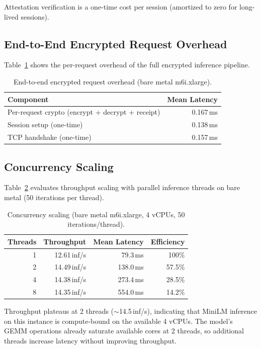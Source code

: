 \documentclass[11pt,a4paper]{article}
\begin{document}
Attestation verification is a one-time cost per session (amortized to zero for long-lived sessions).

\subsection{End-to-End Encrypted Request Overhead}

Table~\ref{tab:e2e} shows the per-request overhead of the full encrypted inference pipeline.

\begin{table}[ht]
\centering
\caption{End-to-end encrypted request overhead (bare metal m6i.xlarge).}
\label{tab:e2e}
\begin{tabular}{lr}
\hline
\textbf{Component} & \textbf{Mean Latency} \\
\hline
Per-request crypto (encrypt + decrypt + receipt) & 0.167\,ms \\
Session setup (one-time)                         & 0.138\,ms \\
TCP handshake (one-time)                         & 0.157\,ms \\
\hline
\end{tabular}
\end{table}

\subsection{Concurrency Scaling}

Table~\ref{tab:concurrency} evaluates throughput scaling with parallel inference threads on bare metal (50 iterations per thread).

\begin{table}[ht]
\centering
\caption{Concurrency scaling (bare metal m6i.xlarge, 4 vCPUs, 50 iterations/thread).}
\label{tab:concurrency}
\begin{tabular}{rrrr}
\hline
\textbf{Threads} & \textbf{Throughput} & \textbf{Mean Latency} & \textbf{Efficiency} \\
\hline
1 & 12.61\,inf/s & 79.3\,ms  & 100\% \\
2 & 14.49\,inf/s & 138.0\,ms & 57.5\% \\
4 & 14.38\,inf/s & 273.4\,ms & 28.5\% \\
8 & 14.35\,inf/s & 554.0\,ms & 14.2\% \\
\hline
\end{tabular}
\end{table}

Throughput plateaus at 2 threads ($\sim$14.5\,inf/s), indicating that MiniLM inference on this instance is compute-bound on the available 4 vCPUs.
The model's GEMM operations already saturate available cores at 2 threads, so additional threads increase latency without improving throughput.
\end{document}

